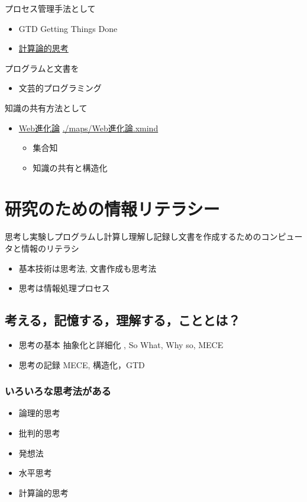 \documentclass[dvipdfmx,11pat]{jarticle}
\begin{document}
プロセス管理手法として
\begin{itemize}
\item GTD Getting Things Done
\item \href{./comp\_thinking.org}{計算論的思考}
\end{itemize}

プログラムと文書を
\begin{itemize}
\item 文芸的プログラミング
\end{itemize}

知識の共有方法として
\begin{itemize}
\item \href{./web.org}{Web進化論}  \url{./maps/Web進化論.xmind}
\begin{itemize}
\item 集合知
\item 知識の共有と構造化
\end{itemize}
\end{itemize}
\section{研究のための情報リテラシー}
\label{sec:org037a56a}

思考し実験しプログラムし計算し理解し記録し文書を作成するためのコンピュー
タと情報のリテラシ

\begin{itemize}
\item 基本技術は思考法, 文書作成も思考法
\item 思考は情報処理プロセス
\end{itemize}
\subsection{考える，記憶する，理解する，こととは？}
\label{sec:org328c4c0}

\begin{itemize}
\item 思考の基本 抽象化と詳細化 , So What, Why so, MECE
\item 思考の記録 MECE, 構造化，GTD
\end{itemize}
\subsubsection{いろいろな思考法がある}
\label{sec:org9318be1}
\begin{itemize}
\item 論理的思考
\item 批判的思考
\item 発想法
\item 水平思考
\item 計算論的思考
\end{itemize}
\end{document}
